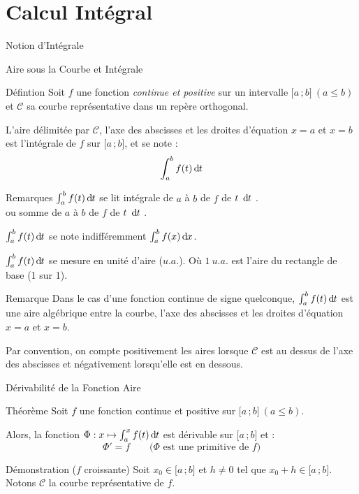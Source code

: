 \documentclass{coursbook}
\begin{document}
    \chapter{Calcul Intégral}

    \begin{Gpartie}{Notion d'Intégrale} 
        \begin{Spartie}{Aire sous la Courbe et Intégrale} 
            \begin{SSpartie}{Défintion} 
                Soit $f$ une fonction \emph{continue et positive} sur un intervalle $\big[a\,; b\big]~\left(a\leq b\right)$ et $\mathcal{C}$ sa courbe représentative dans un repère orthogonal.

                L'aire délimitée par $\mathcal{C}$, l'axe des abscisses et les droites d'équation $x=a$ et $x=b$ est l'intégrale de $f$ sur $\big[a\,; b\big]$, et se note : \[\int_a^b f(t)\,\mathrm{d}\hspace*{-0.05em}t\]
            \end{SSpartie}
            \begin{SSpartie}{Remarques} 
                $\int_a^b f(t)\,\mathrm{d}\hspace*{-0.05em}t$ se lit \og intégrale de $a$ à $b$ de $f$ de $t~\,\mathrm{d}\hspace*{-0.05em}t$ \fg{}. \\ ou \og somme de $a$ à $b$ de $f$ de $t~\,\mathrm{d}\hspace*{-0.05em}t$ \fg{}.

                $\int_a^b f(t)\,\mathrm{d}\hspace*{-0.05em}t$ se note indifféremment $\int_a^b f(x)\,\mathrm{d}\hspace*{-0.05em}x$.

                $\int_a^b f(t)\,\mathrm{d}\hspace*{-0.05em}t$ se mesure en unité d'aire ($u.a.$). Où $1~u.a.$ est l'aire du rectangle de base (1 sur 1).
            \end{SSpartie}
            \begin{SSpartie}{Remarque} 
                Dans le cas d'une fonction continue de signe quelconque, $\int_a^b f(t)\,\mathrm{d}\hspace*{-0.05em}t$ est une aire algébrique entre la courbe, l'axe des abscisses et les droites d'équation $x=a$ et $x=b$.

                Par convention, on compte positivement les aires lorsque $\mathcal{C}$ est au dessus de l'axe des abscisses et négativement lorsqu'elle est en dessous.
            \end{SSpartie}
        \end{Spartie}
        \pagebreak
        \begin{Spartie}{Dérivabilité de la Fonction Aire} 
            \begin{SSpartie}{Théorème} 
                Soit $f$ une fonction continue et positive sur $\big[a\,; b\big]~\left(a\leq b\right)$.

                Alors, la fonction $\Phi:x\mapsto\int_a^xf(t)\,\mathrm{d}\hspace*{-0.05em}t$ est dérivable sur $\big[a\,; b\big]$ et : \[\Phi'=f\qquad\text{($\Phi$ est une primitive de $f$)}\]
                \begin{SSSpartie}{Démonstration \big($f$ croissante\big)} 
                    Soit $x_0\in\big[a\,; b\big]$ et $h\neq 0$ tel que $x_0+h\in\big[a\,; b\big]$. Notons $\mathcal{C}$ la courbe représentative de $f$.


\end{SSSpartie}
\end{SSpartie}
\end{Spartie}
\end{Gpartie}
\end{document}
